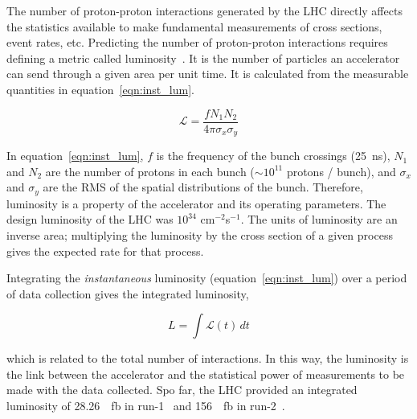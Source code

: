 The number of proton-proton interactions generated by the LHC directly affects the statistics available to make fundamental measurements of cross sections, event rates, etc. 
Predicting the number of proton-proton interactions requires defining a metric called luminosity~\cite{zyla_review_2020}. It is the number of particles an accelerator can send through a given area per unit time. It is calculated from the measurable quantities in equation~\ref{eqn:inst_lum}.

\begin{equation}
\mathcal{L} = \frac{f N_{1} N_{2} }{4 \pi \sigma_{x} \sigma_{y}}
\label{eqn:inst_lum}
\end{equation}

In equation~\ref{eqn:inst_lum}, $f$ is the frequency of the bunch crossings (\SI{25}{\nano\second}), $N_{1}$ and $N_{2}$ are the number of protons in each bunch ($\sim 10^{11}$ protons / bunch), and $\sigma_{x}$ and $\sigma_{y}$ are the RMS of the spatial distributions of the bunch. Therefore, luminosity is a property of the accelerator and its operating parameters. The design luminosity of the LHC was $10^{34}$ cm$^{-2}$s$^{-1}$. The units of luminosity are an inverse area; multiplying the luminosity by the cross section of a given process gives the expected rate for that process.

Integrating the \textit{instantaneous} luminosity (equation~\ref{eqn:inst_lum}) over a period of data collection gives the integrated luminosity,

\begin{equation}
L = \int \mathcal{L} \left( t \right) \,dt
\label{eqn:int_lum}
\end{equation}

which is related to the total number of interactions. In this way, the luminosity is the link between the accelerator and the statistical power of measurements to be made with the data collected. Spo far, the LHC provided an integrated luminosity of \SI{28.26}{\per\femto\barn} in run-1~\cite{atlas_luminosity_run1} and \SI{156}{\per\femto\barn} in run-2~\cite{atlas_luminosity_run2}.

